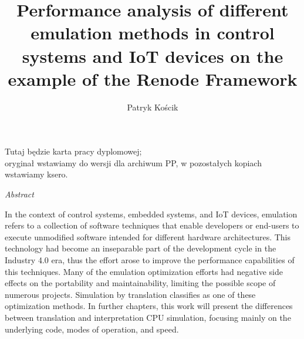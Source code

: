 \documentclass[english,bachelor,a4paper,oneside]{ppfcmthesis}
\author
{%
   Patryk Kościk \album{144635}
}
\title
{%
   Performance analysis of different emulation methods 
   in control systems and IoT devices on the example of
   the Renode Framework
}
\begin{document}
\frontmatter\pagestyle{empty}%
\maketitle\cleardoublepage%


\thispagestyle{empty}\vspace*{\fill}%
\begin{center}Tutaj będzie karta pracy dyplomowej;\\oryginał wstawiamy do wersji dla archiwum PP, w pozostałych kopiach wstawiamy ksero.\end{center}%
\vfill\cleardoublepage%



\begin{vplace}

\begin{center}
   \huge{\textit{Abstract}}
\end{center}

In the context of control systems, embedded systems, and IoT devices, emulation refers to a collection of software
techniques that enable developers or end-users to execute unmodified software intended for different hardware
architectures. This technology had become an inseparable part of the development cycle in the Industry 4.0 era, thus the
effort arose to improve the performance capabilities of this techniques. Many of the emulation optimization efforts had
negative side effects on the portability and maintainability, limiting the possible scope of numerous projects.
Simulation by translation classifies as one of these optimization methods. In further chapters, this work will
present the differences between translation and interpretation CPU simulation, focusing mainly on the underlying code,
modes of operation, and speed.

\end{vplace}

\newpage
\end{document}

